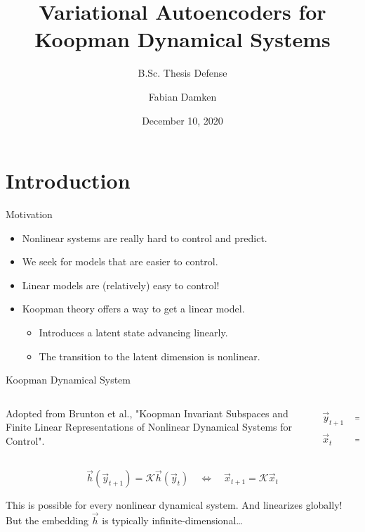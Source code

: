 \documentclass[
	aspectratio=43,
	color={accentcolor=1c},
	logo=false,
	colorframetitle=true,
]{tudabeamer}
\title{Variational Autoencoders for Koopman Dynamical Systems}
\subtitle{B.Sc. Thesis Defense}
\author{Fabian Damken}
\institute{Intelligent Autonomous Systems}
\date{December 10, 2020}
\begin{document}
	\maketitle

	\section{Introduction}
		\begin{frame}{Motivation}
			\begin{itemize}
				\item Nonlinear systems are really hard to control and predict.
				\item We seek for models that are easier to control.
				\item Linear models are (relatively) easy to control!
				\item Koopman theory offers a way to get a linear model.
					\begin{itemize}
						\item Introduces a latent state advancing linearly.
						\item The transition to the latent dimension is nonlinear.
					\end{itemize}
			\end{itemize}
		\end{frame}

		\begin{frame}[c]{Koopman Dynamical System}
			\vspace{-0.5cm}
			\begin{columns}[c]
				\begin{column}{0.85\linewidth}
					\begin{center}
						\resizebox{\linewidth}{!}{\tikzKoopmanOperator}
					\end{center}
					\vspace{-0.5cm}
					\begin{center}
						\footnotesize
						Adopted from Brunton et al., "Koopman Invariant Subspaces and Finite Linear Representations of Nonlinear Dynamical Systems for Control".
					\end{center}
				\end{column}
				\begin{column}{0.15\linewidth}
					\begin{align*}
						\vec{y}_{t + 1} &= \vec{F}(\vec{y}_t) \\
						      \vec{x}_t &= \vec{h}(\vec{y}_t)
					\end{align*}
				\end{column}
			\end{columns}
			\vspace{0.5cm}

			\begin{equation*}
				\vec{h}(\vec{y}_{t + 1}) = \mathcal{K} \vec{h}(\vec{y}_t)
				\quad\iff\quad
				\vec{x}_{t + 1} = \mathcal{K} \vec{x}_t
			\end{equation*}

			This is possible for every nonlinear dynamical system. And linearizes globally! But the embedding \(\vec{h}\) is typically infinite-dimensional\dots
		\end{frame}
\end{document}
